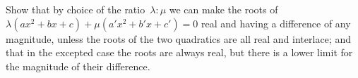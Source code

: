 {\Loosen Show that by choice of the ratio~$\lambda : \mu$ we can make the roots of
$\lambda(ax^{2} + bx + c) + \mu(a'x^{2} + b'x + c') = 0$ real and having a difference of any magnitude,
unless the roots of the two quadratics are all real and interlace; and
that in the excepted case the roots are always real, but there is a lower limit
for the magnitude of their difference. }

